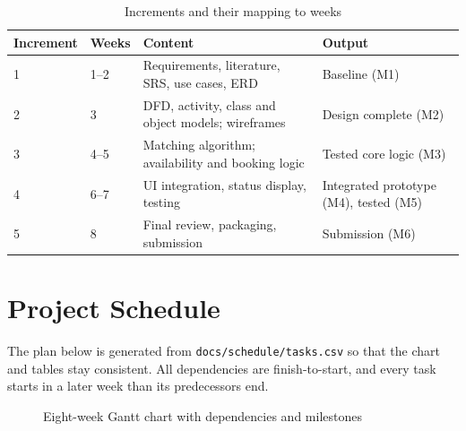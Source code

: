 \documentclass[11pt,a4paper]{article}
\begin{document}
\begin{table}[H]
\centering
\caption{Increments and their mapping to weeks}
\small
\begin{tabularx}{\linewidth}{@{}l l X X@{}}
\toprule
\textbf{Increment} & \textbf{Weeks} & \textbf{Content} & \textbf{Output}\\ \midrule
1 & 1--2 & Requirements, literature, SRS, use cases, ERD & Baseline (M1)\\
2 & 3 & DFD, activity, class and object models; wireframes & Design complete (M2)\\
3 & 4--5 & Matching algorithm; availability and booking logic & Tested core logic (M3)\\
4 & 6--7 & UI integration, status display, testing & Integrated prototype (M4), tested (M5)\\
5 & 8 & Final review, packaging, submission & Submission (M6)\\
\bottomrule
\end{tabularx}
\end{table}

\section{Project Schedule}\label{sec:schedule}
The plan below is generated from \texttt{docs/schedule/tasks.csv} so that the chart and tables stay consistent. All dependencies are finish-to-start, and every task starts in a later week than its predecessors end.

\begin{landscape}
\begin{figure}[H]
\centering
\resizebox{!}{0.68\textheight}{}
\caption{Eight-week Gantt chart with dependencies and milestones}
\label{fig:gantt}
\end{figure}
\end{landscape}

\begin{table}[H]
\centering
\caption{Task list with dependencies and deliverables}
\small

\end{table}

\begin{table}[H]
\centering
\caption{Milestones}
\small

\end{table}

\end{document}
